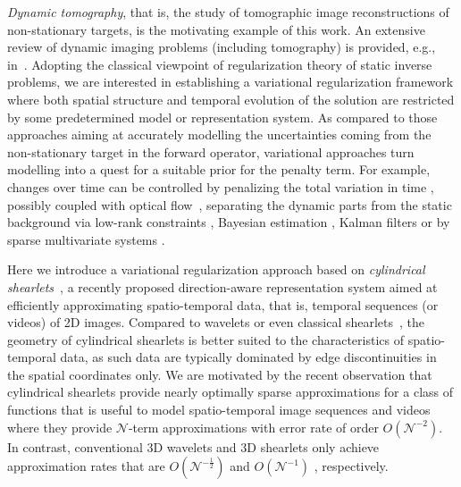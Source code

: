 \documentclass[11pt,a4paper]{article}
\numberwithin{equation}{section}
\begin{document}
\textit{Dynamic tomography}, that is, the study of tomographic image  reconstructions of non-stationary targets, is the motivating example of this work.
An extensive review of dynamic imaging problems (including tomography) is provided, e.g., in~\cite{lechleiter2018dynamic, hampel2022review, hauptmann2021image}.
Adopting the classical viewpoint of regularization theory of static inverse problems, we are interested in establishing a variational regularization framework where both spatial structure and temporal evolution of the solution are restricted by some predetermined model or representation system. As compared to those approaches aiming at accurately modelling the uncertainties coming from the non-stationary target in the forward operator, variational approaches turn modelling into a quest for a suitable prior for the penalty term. For example, changes over time can be controlled by penalizing the total variation in time \cite{papoutsellis2021core, pasha2023computational}, possibly coupled with optical flow~\cite{burger2017variational}, separating the dynamic parts from the static background via low-rank constraints \cite{gao2011robust, otazo2015low, wang2014fast, arridge2020joint},
Bayesian estimation \cite{fall2013dynamic, myers2014improving, lan2023spatiotemporal}, 
Kalman filters \cite{schmitt2002efficient, hakkarainen2019undersampled} 
or by sparse multivariate systems \cite{tan2015tensor, Bubba20, bubba2023efficient, kadu2023single}. 

Here we introduce a variational regularization approach based on \textit{cylindrical shearlets}~\cite{Easley21}, a recently proposed direction-aware representation system aimed at efficiently approximating spatio-temporal data, that is, temporal sequences (or videos) of 2D images. Compared to wavelets or even classical shearlets~\cite{shearlets}, the geometry of cylindrical shearlets is better suited to the characteristics of spatio-temporal data, as such data are typically dominated by edge discontinuities in the spatial coordinates only. We are motivated by the recent observation that cylindrical shearlets provide nearly optimally sparse approximations for a class of functions that is useful to model spatio-temporal image sequences and videos~\cite{Easley21, bubba2023efficient}
where they provide $\mathscr{N}$-term approximations with error rate of order $O(\mathscr{N}^{-2})$. In contrast, conventional 3D wavelets and 3D shearlets only achieve approximation rates that are $O(\mathscr{N}^{-\frac{1}{2}})$ \cite{devore1998} and $O(\mathscr{N}^{-1})$ \cite{GL_3D}, respectively.
\end{document}
